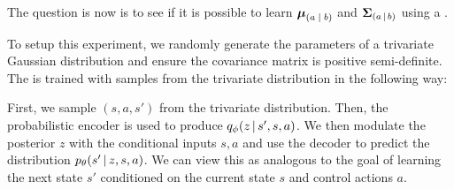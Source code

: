 The question is now is to see if it is possible to learn $\vec{\mu}_{\given*{a}{b}}$ and $\vec{\Sigma}_{\given{a}{b}}$ using a \cvae{}.



To setup this experiment, we randomly generate the parameters of a trivariate Gaussian distribution and ensure the covariance matrix is positive semi-definite. The \cvae{} is trained with samples from the trivariate distribution in the following way:

First, we sample $(s, a, s')$ from the trivariate distribution. Then, the probabilistic encoder is used to produce $\qphi \given{z}{s', s, a}$. We then modulate the posterior $z$ with the conditional inputs $s, a$ and use the decoder to predict the distribution $\ptheta \given{s'}{z, s, a}$. We can view this as analogous to the goal of learning the next state $s'$ conditioned on the current state $s$ and control actions $a$.

